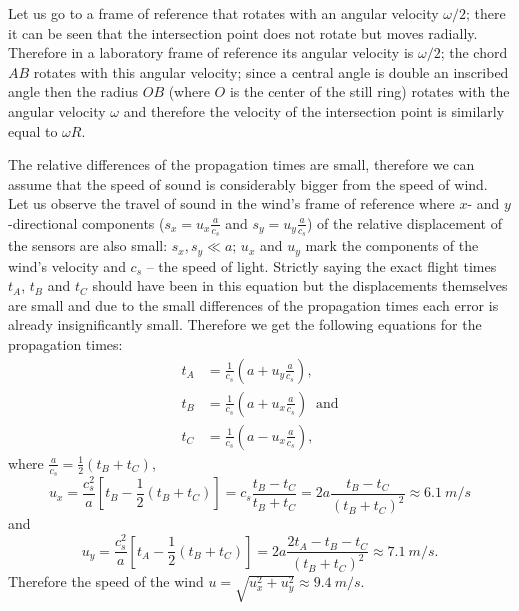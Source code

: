 \documentclass[11pt]{article}
\begin{document}

\solueng
Let us go to a frame of reference that rotates with an angular velocity $\omega/2$; there it can be seen that the intersection point does not rotate but moves radially. Therefore in a laboratory frame of reference its angular velocity is $\omega/2$; the chord $AB$ rotates with this angular velocity; since a central angle is double an inscribed angle then the radius $OB$ (where $O$ is the center of the still ring) rotates with the angular velocity $\omega$ and therefore the velocity of the intersection point is similarly equal to $\omega R$.
\probend
\bigskip


\solueng
The relative differences of the propagation times are small, therefore we can assume that the speed of sound is considerably bigger from the speed of wind. Let us observe the travel of sound in the wind’s frame of reference where $x$- and $y$-directional components ($s_x=u_x\frac a{c_s}$ and $s_y=u_y\frac a{c_s}$) of the relative displacement of the sensors are also small: $s_x, s_y\ll a$; $u_x$ and $u_y$ mark the components of the wind’s velocity and $c_s$ – the speed of light. Strictly saying the exact flight times $t_A$, $t_B$ and $t_C$ should have been in this equation but the displacements themselves are small and due to the small differences of the propagation times each error is already insignificantly small. Therefore we get the following equations for the propagation times:
\begin{align*}
t_A&=\frac 1{c_s}\left(a+u_y\frac a{c_s}\right),\\
t_B&=\frac 1{c_s}\left(a+u_x\frac a{c_s}\right)\;\; \mbox{and}\\
t_C&=\frac 1{c_s}\left(a-u_x\frac a{c_s}\right),
\end{align*}
where $ \frac a{c_s}=\frac 12(t_B+t_C)$,
$$u_x=\frac {c_s^2}a\left[t_B-\frac 12(t_B+t_C)\right]=c_s\frac{t_B-t_C}{t_B+t_C}=2a\frac{t_B-t_C}{(t_B+t_C)^2}\approx \SI{6.1}{m/s}$$
and
$$u_y=\frac {c_s^2}a\left[t_A-\frac 12(t_B+t_C)\right]=2a\frac{2t_A-t_B-t_C}{(t_B+t_C)^2}\approx \SI{7.1}{m/s}.$$
Therefore the speed of the wind $u=\sqrt{u_x^2+u_y^2}\approx \SI{9.4}{m/s}$.
\probend
\bigskip

\end{document}
